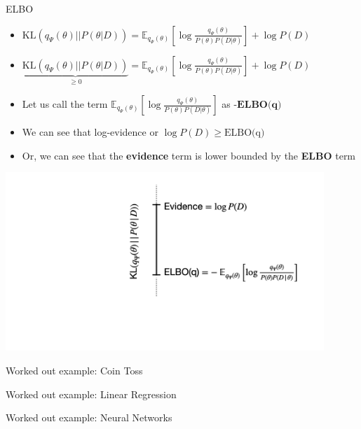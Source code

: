\documentclass{beamer}
\begin{document}
\begin{frame}{ELBO}
    \begin{itemize}
        \item $\text{KL}(q_{\Psi}(\theta)||P(\theta|D)) =  \mathbb{E}_{q_{\Psi}(\theta)} \left[ \log \frac{q_{\Psi}(\theta)}{P(\theta)P(D|\theta)} \right] + \log P(D)$
        \item \pause $\underbrace{\text{KL}(q_{\Psi}(\theta)||P(\theta|D))}_{\geq 0} =  \mathbb{E}_{q_{\Psi}(\theta)} \left[ \log \frac{q_{\Psi}(\theta)}{P(\theta)P(D|\theta)} \right] + \log P(D)$
        \item \pause Let us call the term $\mathbb{E}_{q_{\Psi}(\theta)} \left[ \log \frac{q_{\Psi}(\theta)}{P(\theta)P(D|\theta)} \right]$ as $\textbf{-ELBO(q)}$
        \item \pause We can see that log-evidence or $\log P(D) \geq \text{ELBO(q)}$
        \item \pause Or, we can see that the \textbf{evidence} term is lower bounded by the \textbf{ELBO} term
    \end{itemize}

    \pause \includegraphics[width=0.9\textwidth]{../diagrams/kl-elbo.png}

\end{frame}
    
\begin{frame}{Worked out example: Coin Toss}
   
\end{frame}

\begin{frame}{Worked out example: Linear Regression}
    
\end{frame}

\begin{frame}{Worked out example: Neural Networks}
\end{frame}

    
\end{document}
